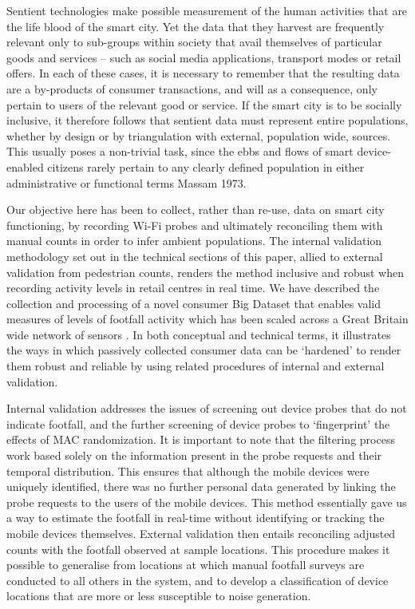 Sentient technologies make possible measurement of the human activities that are
the life blood of the smart city. Yet the data that they harvest are frequently
relevant only to sub-groups within society that avail themselves of particular
goods and services – such as social media applications, transport modes or
retail offers. In each of these cases, it is necessary to remember that the
resulting data are a by-products of consumer transactions, and will as a
consequence, only pertain to users of the relevant good or service. If the smart
city is to be socially inclusive, it therefore follows that sentient data must
represent entire populations, whether by design or by triangulation with
external, population wide, sources. This usually poses a non-trivial task, since
the ebbs and flows of smart device-enabled citizens rarely pertain to any
clearly defined population in either administrative or functional terms Massam
1973.

Our objective here has been to collect, rather than re-use, data on smart city
functioning, by recording Wi-Fi probes and ultimately reconciling them with
manual counts in order to infer ambient populations. The internal validation
methodology set out in the technical sections of this paper, allied to external
validation from pedestrian counts, renders the method inclusive and robust when
recording activity levels in retail centres in real time. We have described the
collection and processing of a novel consumer Big Dataset that enables valid
measures of levels of footfall activity which has been scaled across a Great
Britain wide network of sensors \citep{cdrc2018consumer}.  In both conceptual and technical
terms, it illustrates the ways in which passively collected consumer data can be
‘hardened’ to render them robust and reliable by using related procedures of
internal and external validation.

Internal validation addresses the issues of screening out device probes that do
not indicate footfall, and the further screening of device probes to
‘fingerprint’ the effects of MAC randomization. It is important to note that the
filtering process work based solely on the information present in the probe
requests and their temporal distribution. This ensures that although the mobile
devices were uniquely identified, there was no further personal data generated
by linking the probe requests to the users of the mobile devices. This method
essentially gave us a way to estimate the footfall in real-time without
identifying or tracking the mobile devices themselves. External validation then
entails reconciling adjusted counts with the footfall observed at sample
locations. This procedure makes it possible to generalise from locations at
which manual footfall surveys are conducted to all others in the system, and to
develop a classification of device locations that are more or less susceptible
to noise generation.

